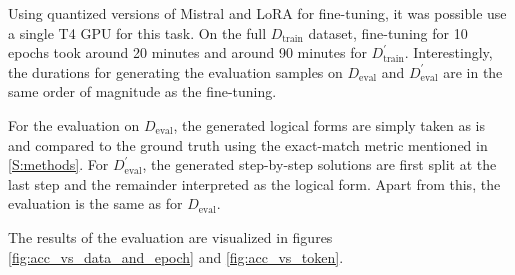 \documentclass[11pt]{article}
\begin{document}
    Using quantized versions of Mistral \cite{unsloth_unslothmistral-7b-instruct-v02-bnb-4bit_2024} and LoRA for fine-tuning,
    it was possible use a single T4 GPU for this task.
    On the full $D_\mathrm{train}$ dataset, fine-tuning for 10 epochs took around 20 minutes and around 90 minutes
    for $D_\mathrm{train}^\prime$.
    Interestingly, the durations for generating the evaluation samples on $D_\mathrm{eval}$ and $D_\mathrm{eval}^\prime$
    are in the same order of magnitude as the fine-tuning.

    For the evaluation on $D_\mathrm{eval}$, the generated logical forms are simply taken as is and compared to the ground
    truth using the exact-match metric mentioned in \ref{S:methods}.
    For $D_\mathrm{eval}^\prime$, the generated step-by-step solutions are first split at the last step and the remainder
    interpreted as the logical form.
    Apart from this, the evaluation is the same as for $D_\mathrm{eval}$.

    The results of the evaluation are visualized in figures  \ref{fig:acc_vs_data_and_epoch} and  \ref{fig:acc_vs_token}.
%
%
\end{document}
